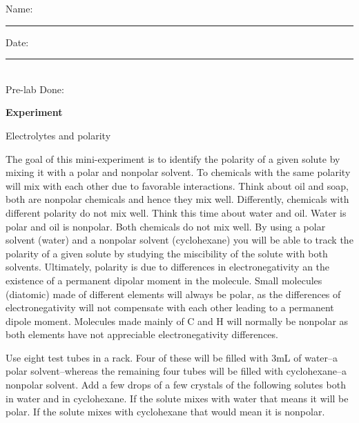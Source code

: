 \documentclass[main.tex]{subfiles}
\begin{document}
\begin{fullwidth}
\begin{enumerate}
\end{enumerate}


\clearpage\mbox{}\clearpage



\begin{multicols}{2}
\begin{tcolorbox}[enhanced jigsaw,breakable,size=title,
colback=mybrown!05,colframe=black,fonttitle=\bfseries,
title=STUDENT INFO,pad at break=1mm, break at=15cm/0pt ]
\vspace{0.2cm}
\noindent Name: \rule{5cm}{0.4pt}Date:\rule{1cm}{0.4pt}\\
Pre-lab Done: \quad
\end{tcolorbox}
\end{multicols}
\hfill
\vspace{0.2cm}
\begin{center}
{\large \bfseries 
Experiment
\par
\Huge
Electrolytes and polarity
\\[5pt] \par}
\vspace{0.2cm}
\end{center}
\par
\noindent
\uline{  \hfill \normalsize \hfill       }

\vspace{0.2cm}{\large \bfseries 1. Polarity and miscibility}
The goal of this mini-experiment is to identify the polarity of a given solute by mixing it with a polar and nonpolar solvent. To chemicals with the same polarity will mix with each other due to favorable interactions. Think about oil and soap, both are nonpolar chemicals and hence they mix well. Differently, chemicals with different polarity do not mix well. Think this time about water and oil. Water is polar and oil is nonpolar. Both chemicals do not mix well. By using a polar solvent (water) and a nonpolar solvent (cyclohexane) you will be able to track the polarity of a given solute by studying the miscibility of the solute with both solvents. Ultimately, polarity is due to differences in electronegativity an the existence of a permanent dipolar moment in the molecule. Small molecules (diatomic) made of different elements will always be polar, as the differences of electronegativity will not compensate with each other leading to a permanent dipole moment. Molecules made mainly of C and H will normally be nonpolar as both elements have not appreciable electronegativity differences.
\begin{steps}
    \newstep[] Use eight test tubes in a rack. Four of these will be filled with 3mL of water--a polar solvent--whereas the remaining four tubes will be filled with cyclohexane--a nonpolar solvent.
    \newstep[] Add a few drops of a few crystals of the following solutes both in water and in cyclohexane. If the solute mixes with water that means it will be polar. If the solute mixes with cyclohexane that would mean it is nonpolar.
\end{steps}


\end{fullwidth}
\end{document}
